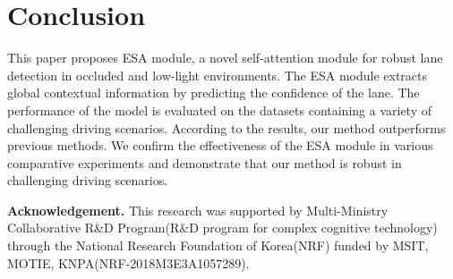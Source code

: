\documentclass[10pt,twocolumn,letterpaper]{article}
\begin{document}
\section{Conclusion}
This paper proposes ESA module, a novel self-attention module for robust lane detection in occluded and low-light environments. The ESA module extracts global contextual information by predicting the confidence of the lane. The performance of the model is evaluated on the datasets containing a variety of challenging driving scenarios. According to the results, our method outperforms previous methods. We confirm the effectiveness of the ESA module in various comparative experiments and demonstrate that our method is robust in challenging driving scenarios.

\noindent\footnotesize\textbf{Acknowledgement.} This research was supported by Multi-Ministry Collaborative R\&D Program(R\&D program for complex cognitive technology) through the National Research Foundation of Korea(NRF) funded by MSIT, MOTIE, KNPA(NRF-2018M3E3A1057289).


{\small


}
\end{document}
